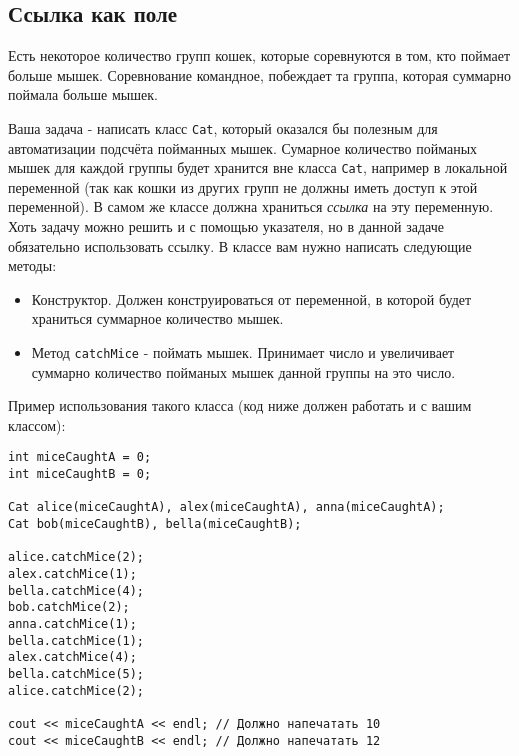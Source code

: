 \documentclass{article}
\begin{document}
\subsection{Ссылка как поле}
Есть некоторое количество групп кошек, которые соревнуются в том, кто поймает больше мышек. Соревнование командное, побеждает та группа, которая суммарно поймала больше мышек.

Ваша задача - написать класс \texttt{Cat}, который оказался бы полезным для автоматизации подсчёта пойманных мышек. Сумарное количество пойманых мышек для каждой группы будет хранится вне класса \texttt{Cat}, например в локальной переменной (так как кошки из других групп не должны иметь доступ к этой переменной). В самом же классе должна храниться \textit{ссылка} на эту переменную. Хоть задачу можно решить и с помощью указателя,  но в данной задаче обязательно использовать ссылку. В классе вам нужно написать следующие методы:

\begin{itemize}
\item Конструктор. Должен конструироваться от переменной, в которой будет храниться суммарное количество мышек.
\item Метод \texttt{catchMice} - поймать мышек. Принимает число и увеличивает суммарно количество пойманых мышек данной группы на это число.
\end{itemize}

Пример использования такого класса (код ниже должен работать и с вашим классом):

\begin{lstlisting}
int miceCaughtA = 0;
int miceCaughtB = 0;

Cat alice(miceCaughtA), alex(miceCaughtA), anna(miceCaughtA);
Cat bob(miceCaughtB), bella(miceCaughtB);

alice.catchMice(2);
alex.catchMice(1);
bella.catchMice(4);
bob.catchMice(2);
anna.catchMice(1);
bella.catchMice(1);
alex.catchMice(4);
bella.catchMice(5);
alice.catchMice(2);

cout << miceCaughtA << endl; // Должно напечатать 10
cout << miceCaughtB << endl; // Должно напечатать 12
\end{lstlisting}
\end{document}
